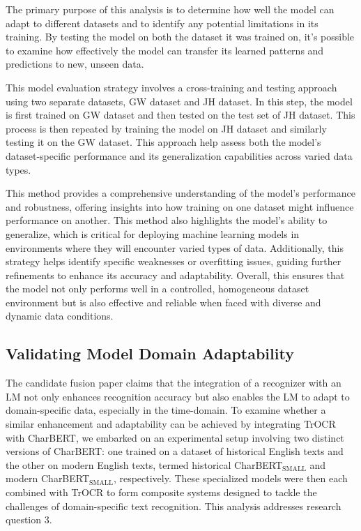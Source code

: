 The primary purpose of this analysis is to determine how well the model can adapt to different datasets and to identify any potential limitations in its training. By testing the model on both the dataset it was trained on, it's possible to examine how effectively the model can transfer its learned patterns and predictions to new, unseen data.

This model evaluation strategy involves a cross-training and testing approach using two separate datasets, GW dataset and JH dataset. In this step, the model is first trained on GW dataset and then tested on the test set of JH dataset. This process is then repeated by training the model on JH dataset and similarly testing it on the GW dataset. This approach help assess both the model's dataset-specific performance and its generalization capabilities across varied data types.

This method provides a comprehensive understanding of the model's performance and robustness, offering insights into how training on one dataset might influence performance on another. This method also highlights the model's ability to generalize, which is critical for deploying machine learning models in environments where they will encounter varied types of data. Additionally, this strategy helps identify specific weaknesses or overfitting issues, guiding further refinements to enhance its accuracy and adaptability. Overall, this ensures that the model not only performs well in a controlled, homogeneous dataset environment but is also effective and reliable when faced with diverse and dynamic data conditions.

\subsection{Validating Model Domain Adaptability}
\label{subsec:5_validating_model_domain_adaptability}
The candidate fusion paper claims that the integration of a recognizer with an LM not only enhances recognition accuracy but also enables the LM to adapt to domain-specific data, especially in the time-domain. To examine whether a similar enhancement and adaptability can be achieved by integrating TrOCR with CharBERT, we embarked on an experimental setup involving two distinct versions of CharBERT: one trained on a dataset of historical English texts and the other on modern English texts, termed historical CharBERT$_{\text{SMALL}}$ and modern CharBERT$_{\text{SMALL}}$, respectively. These specialized models were then each combined with TrOCR to form composite systems designed to tackle the challenges of domain-specific text recognition. This analysis addresses research question 3.

